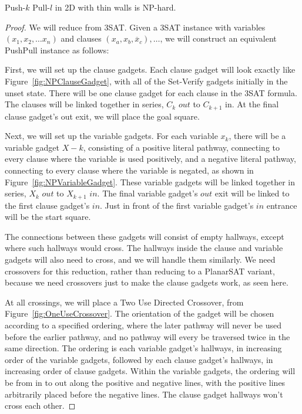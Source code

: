 \begin{theorem}
\label{thm:2DNPhard}
Push-$k$ Pull-$l$ in 2D with thin walls is NP-hard.
\end{theorem}
\begin{proof}
    We will reduce from 3SAT. Given a 3SAT instance with variables $(x_1, x_2, \ldots x_n)$ and clauses $(x_a, x_b, \overline x_c), \ldots$, we will construct an equivalent PushPull instance as follows: 

    First, we will set up the clause gadgets. Each clause gadget will look exactly like Figure~\ref{fig:NPClauseGadget}, with all of the Set-Verify gadgets initially in the unset state. There will be one clause gadget for each clause in the 3SAT formula. The clauses will be linked together in series, $C_k$ $out$ to $C_{k+1}$ in. At the final clause gadget's out exit, we will place the goal square.

    Next, we will set up the variable gadgets. For each variable $x_k$, there will be a variable gadget $X-k$, consisting of a positive literal pathway, connecting to every clause where the variable is used positively, and a negative literal pathway, connecting to every clause where the variable is negated, as shown in Figure~\ref{fig:NPVariableGadget}. These variable gadgets will be linked together in series, $X_k$ $out$ to $X_{k+1}$ $in$. The final variable gadget's $out$ exit will be linked to the first clause gadget's $in$. Just in front of the first variable gadget's $in$ entrance will be the start square.

    The connections between these gadgets will consist of empty hallways, except where such hallways would cross. The hallways inside the clause and variable gadgets will also need to cross, and we will handle them similarly. We need crossovers for this reduction, rather than reducing to a PlanarSAT variant, because we need crossovers just to make the clause gadgets work, as seen here.
    
    At all crossings, we will place a Two Use Directed Crossover, from Figure~\ref{fig:OneUseCrossover}. The orientation of the gadget will be chosen according to a specified ordering, where the later pathway will never be used before the earlier pathway, and no pathway will every be traversed twice in the same direction. The ordering is each variable gadget's hallways, in increasing order of the variable gadgets, followed by each clause gadget's hallways, in increasing order of clause gadgets. Within the variable gadgets, the ordering will be from in to out along the positive and negative lines, with the positive lines arbitrarily placed before the negative lines. The clause gadget hallways won't cross each other.


\end{proof}
